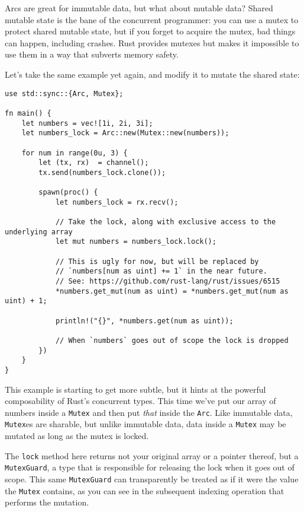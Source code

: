 \documentclass[]{article}
\begin{document}
Arcs are great for immutable data, but what about mutable data? Shared
mutable state is the bane of the concurrent programmer: you can use a
mutex to protect shared mutable state, but if you forget to acquire the
mutex, bad things can happen, including crashes. Rust provides mutexes
but makes it impossible to use them in a way that subverts memory
safety.

Let's take the same example yet again, and modify it to mutate the
shared state:

\begin{verbatim}
use std::sync::{Arc, Mutex};

fn main() {
    let numbers = vec![1i, 2i, 3i];
    let numbers_lock = Arc::new(Mutex::new(numbers));

    for num in range(0u, 3) {
        let (tx, rx)  = channel();
        tx.send(numbers_lock.clone());

        spawn(proc() {
            let numbers_lock = rx.recv();

            // Take the lock, along with exclusive access to the underlying array
            let mut numbers = numbers_lock.lock();

            // This is ugly for now, but will be replaced by
            // `numbers[num as uint] += 1` in the near future.
            // See: https://github.com/rust-lang/rust/issues/6515
            *numbers.get_mut(num as uint) = *numbers.get_mut(num as uint) + 1;

            println!("{}", *numbers.get(num as uint));

            // When `numbers` goes out of scope the lock is dropped
        })
    }
}
\end{verbatim}

This example is starting to get more subtle, but it hints at the
powerful composability of Rust's concurrent types. This time we've put
our array of numbers inside a \texttt{Mutex} and then put \emph{that}
inside the \texttt{Arc}. Like immutable data, \texttt{Mutex}es are
sharable, but unlike immutable data, data inside a \texttt{Mutex} may be
mutated as long as the mutex is locked.

The \texttt{lock} method here returns not your original array or a
pointer thereof, but a \texttt{MutexGuard}, a type that is responsible
for releasing the lock when it goes out of scope. This same
\texttt{MutexGuard} can transparently be treated as if it were the value
the \texttt{Mutex} contains, as you can see in the subsequent indexing
operation that performs the mutation.
\end{document}

